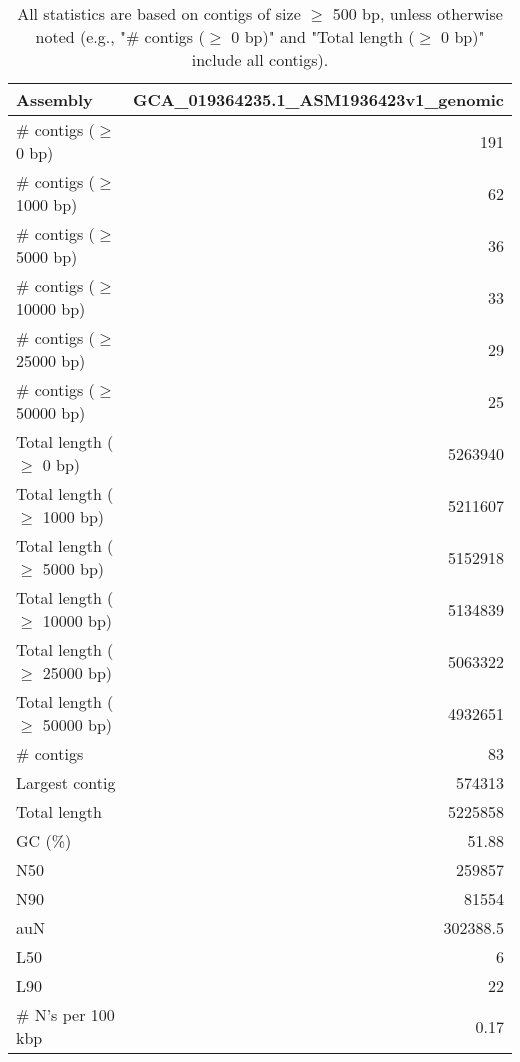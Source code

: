 \documentclass[12pt,a4paper]{article}
\begin{document}
\begin{table}[ht]
\begin{center}
\caption{All statistics are based on contigs of size $\geq$ 500 bp, unless otherwise noted (e.g., "\# contigs ($\geq$ 0 bp)" and "Total length ($\geq$ 0 bp)" include all contigs).}
\begin{tabular}{|l*{1}{|r}|}
\hline
Assembly & GCA\_019364235.1\_ASM1936423v1\_genomic \\ \hline
\# contigs ($\geq$ 0 bp) & 191 \\ \hline
\# contigs ($\geq$ 1000 bp) & 62 \\ \hline
\# contigs ($\geq$ 5000 bp) & 36 \\ \hline
\# contigs ($\geq$ 10000 bp) & 33 \\ \hline
\# contigs ($\geq$ 25000 bp) & 29 \\ \hline
\# contigs ($\geq$ 50000 bp) & 25 \\ \hline
Total length ($\geq$ 0 bp) & 5263940 \\ \hline
Total length ($\geq$ 1000 bp) & 5211607 \\ \hline
Total length ($\geq$ 5000 bp) & 5152918 \\ \hline
Total length ($\geq$ 10000 bp) & 5134839 \\ \hline
Total length ($\geq$ 25000 bp) & 5063322 \\ \hline
Total length ($\geq$ 50000 bp) & 4932651 \\ \hline
\# contigs & 83 \\ \hline
Largest contig & 574313 \\ \hline
Total length & 5225858 \\ \hline
GC (\%) & 51.88 \\ \hline
N50 & 259857 \\ \hline
N90 & 81554 \\ \hline
auN & 302388.5 \\ \hline
L50 & 6 \\ \hline
L90 & 22 \\ \hline
\# N's per 100 kbp & 0.17 \\ \hline
\end{tabular}
\end{center}
\end{table}
\end{document}
